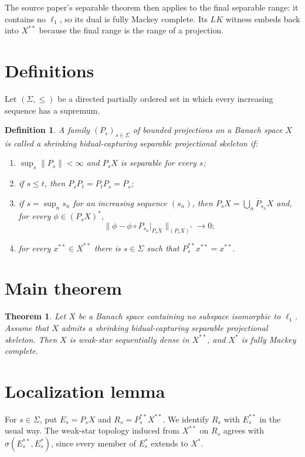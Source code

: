 \documentclass[11pt]{article}
\newtheorem{theorem}{Theorem}
\newtheorem{definition}{Definition}
\newcommand{\ol}{\overline}
\begin{document}
The source paper's separable theorem then applies to the final separable range:
it contains no $\ell_1$, so its dual is fully Mackey complete.  Its $LK$
witness embeds back into $X^{**}$ because the final range is the range of a
projection.

\section*{Definitions}

Let $(\Sigma,\leq)$ be a directed partially ordered set in which every
increasing sequence has a supremum.

\begin{definition}
A family $(P_s)_{s\in\Sigma}$ of bounded projections on a Banach space $X$ is
called a shrinking bidual-capturing separable projectional skeleton if:
\begin{enumerate}
\item $\sup_s\|P_s\|<\infty$ and $P_sX$ is separable for every $s$;
\item if $s\leq t$, then $P_sP_t=P_tP_s=P_s$;
\item if $s=\sup_n s_n$ for an increasing sequence $(s_n)$, then
$P_sX=\ol{\bigcup_n P_{s_n}X}$ and, for every $\phi\in (P_sX)^*$,
\[
\|\phi-\phi\circ P_{s_n}|_{P_sX}\|_{(P_sX)^*}\longrightarrow 0;
\]
\item for every $x^{**}\in X^{**}$ there is $s\in\Sigma$ such that
$P_s^{**}x^{**}=x^{**}$.
\end{enumerate}
\end{definition}

\section*{Main theorem}

\begin{theorem}\label{thm:main}
Let $X$ be a Banach space containing no subspace isomorphic to $\ell_1$.
Assume that $X$ admits a shrinking bidual-capturing separable projectional
skeleton.  Then $X$ is weak-star sequentially dense in $X^{**}$, and $X^*$ is
fully Mackey complete.
\end{theorem}

\section*{Localization lemma}

For $s\in\Sigma$, put $E_s=P_sX$ and $R_s=P_s^{**}X^{**}$.  We identify $R_s$
with $E_s^{**}$ in the usual way.  The weak-star topology induced from $X^{**}$
on $R_s$ agrees with $\sigma(E_s^{**},E_s^*)$, since every member of $E_s^*$
extends to $X^*$.
\end{document}
